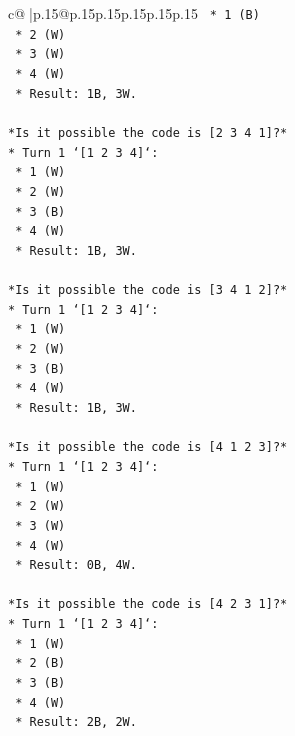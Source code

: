 \documentclass{article}
\begin{document}
{\begin{supertabular}{c@{$\;$}|p{.15\linewidth}@{}p{.15\linewidth}p{.15\linewidth}p{.15\linewidth}p{.15\linewidth}p{.15\linewidth}}
{{{\texttt{    *   1 (B)} \\
\texttt{    *   2 (W)} \\
\texttt{    *   3 (W)} \\
\texttt{    *   4 (W)} \\
\texttt{    *   Result: 1B, 3W.} \\
\\ 
\texttt{*Is it possible the code is {[}2 3 4 1{]}?*} \\
\texttt{*   Turn 1 `{[}1 2 3 4{]}`:} \\
\texttt{    *   1 (W)} \\
\texttt{    *   2 (W)} \\
\texttt{    *   3 (B)} \\
\texttt{    *   4 (W)} \\
\texttt{    *   Result: 1B, 3W.} \\
\\ 
\texttt{*Is it possible the code is {[}3 4 1 2{]}?*} \\
\texttt{*   Turn 1 `{[}1 2 3 4{]}`:} \\
\texttt{    *   1 (W)} \\
\texttt{    *   2 (W)} \\
\texttt{    *   3 (B)} \\
\texttt{    *   4 (W)} \\
\texttt{    *   Result: 1B, 3W.} \\
\\ 
\texttt{*Is it possible the code is {[}4 1 2 3{]}?*} \\
\texttt{*   Turn 1 `{[}1 2 3 4{]}`:} \\
\texttt{    *   1 (W)} \\
\texttt{    *   2 (W)} \\
\texttt{    *   3 (W)} \\
\texttt{    *   4 (W)} \\
\texttt{    *   Result: 0B, 4W.} \\
\\ 
\texttt{*Is it possible the code is {[}4 2 3 1{]}?*} \\
\texttt{*   Turn 1 `{[}1 2 3 4{]}`:} \\
\texttt{    *   1 (W)} \\
\texttt{    *   2 (B)} \\
\texttt{    *   3 (B)} \\
\texttt{    *   4 (W)} \\
\texttt{    *   Result: 2B, 2W.} \\
\\ 
}}}
\end{supertabular}}
\end{document}
